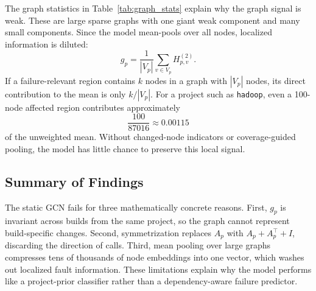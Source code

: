The graph statistics in Table~\ref{tab:graph_stats} explain why the graph signal is weak. These are large sparse graphs with one giant weak component and many small components. Since the model mean-pools over all nodes, localized information is diluted:
\[
g_p=\frac{1}{|V_p|}\sum_{v\in V_p}H_{p,v}^{(2)}.
\]
If a failure-relevant region contains $k$ nodes in a graph with $|V_p|$ nodes, its direct contribution to the mean is only $k/|V_p|$. For a project such as \texttt{hadoop}, even a 100-node affected region contributes approximately
\[
\frac{100}{87016}\approx 0.00115
\]
of the unweighted mean. Without changed-node indicators or coverage-guided pooling, the model has little chance to preserve this local signal.

\subsection{Summary of Findings}

The static GCN fails for three mathematically concrete reasons. First, $g_p$ is invariant across builds from the same project, so the graph cannot represent build-specific changes. Second, symmetrization replaces $A_p$ with $A_p+A_p^\top+I$, discarding the direction of calls. Third, mean pooling over large graphs compresses tens of thousands of node embeddings into one vector, which washes out localized fault information. These limitations explain why the model performs like a project-prior classifier rather than a dependency-aware failure predictor.
